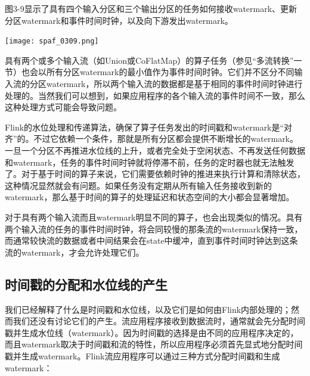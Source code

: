 \documentclass[oneside]{ctexbook}
\begin{document}
图3-9显示了具有四个输入分区和三个输出分区的任务如何接收watermark、更新分区watermark和事件时间时钟，以及向下游发出watermark。

\noindent \texttt{[image: spaf\_0309.png]}

具有两个或多个输入流（如Union或CoFlatMap）的算子任务（参见“多流转换”一节）也会以所有分区watermark的最小值作为事件时间时钟。它们并不区分不同输入流的分区watermark，所以两个输入流的数据都是基于相同的事件时间时钟进行处理的。当然我们可以想到，如果应用程序的各个输入流的事件时间不一致，那么这种处理方式可能会导致问题。

Flink的水位处理和传递算法，确保了算子任务发出的时间戳和watermark是“对齐”的。不过它依赖一个条件，那就是所有分区都会提供不断增长的watermark。一旦一个分区不再推进水位线的上升，或者完全处于空闲状态、不再发送任何数据和watermark，任务的事件时间时钟就将停滞不前，任务的定时器也就无法触发了。对于基于时间的算子来说，它们需要依赖时钟的推进来执行计算和清除状态，这种情况显然就会有问题。如果任务没有定期从所有输入任务接收到新的watermark，那么基于时间的算子的处理延迟和状态空间的大小都会显著增加。

对于具有两个输入流而且watermark明显不同的算子，也会出现类似的情况。具有两个输入流的任务的事件时间时钟，将会同较慢的那条流的watermark保持一致，而通常较快流的数据或者中间结果会在state中缓冲，直到事件时间时钟达到这条流的watermark，才会允许处理它们。

\subsection{时间戳的分配和水位线的产生}

我们已经解释了什么是时间戳和水位线，以及它们是如何由Flink内部处理的；然而我们还没有讨论它们的产生。流应用程序接收到数据流时，通常就会先分配时间戳并生成水位线（watermark）。因为时间戳的选择是由不同的应用程序决定的，而且watermark取决于时间戳和流的特性，所以应用程序必须首先显式地分配时间戳并生成watermark。Flink流应用程序可以通过三种方式分配时间戳和生成watermark：
\end{document}
